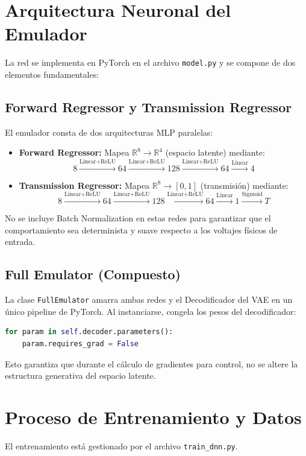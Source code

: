 \documentclass[12pt,letterpaper]{article}
\begin{document}
\section{Arquitectura Neuronal del Emulador}
La red se implementa en PyTorch en el archivo \texttt{model.py} y se compone de dos elementos fundamentales:

\subsection{Forward Regressor y Transmission Regressor}
El emulador consta de dos arquitecturas MLP paralelas:
\begin{itemize}
    \item \textbf{Forward Regressor:} Mapea $\mathbb{R}^8 \to \mathbb{R}^4$ (espacio latente) mediante:
    \begin{equation}
        8 \xrightarrow{\text{Linear+ReLU}} 64 \xrightarrow{\text{Linear+ReLU}} 128 \xrightarrow{\text{Linear+ReLU}} 64 \xrightarrow{\text{Linear}} 4
    \end{equation}
    \item \textbf{Transmission Regressor:} Mapea $\mathbb{R}^8 \to [0, 1]$ (transmisión) mediante:
    \begin{equation}
        8 \xrightarrow{\text{Linear+ReLU}} 64 \xrightarrow{\text{Linear+ReLU}} 128 \xrightarrow{\text{Linear+ReLU}} 64 \xrightarrow{\text{Linear}} 1 \xrightarrow{\text{Sigmoid}} T
    \end{equation}
\end{itemize}
No se incluye Batch Normalization en estas redes para garantizar que el comportamiento sea determinista y suave respecto a los voltajes físicos de entrada.

\subsection{Full Emulator (Compuesto)}
La clase \texttt{FullEmulator} amarra ambas redes y el Decodificador del VAE en un único pipeline de PyTorch. Al instanciarse, congela los pesos del decodificador:
\begin{lstlisting}[language=Python]
for param in self.decoder.parameters():
    param.requires_grad = False
\end{lstlisting}
Esto garantiza que durante el cálculo de gradientes para control, no se altere la estructura generativa del espacio latente.

\section{Proceso de Entrenamiento y Datos}
El entrenamiento está gestionado por el archivo \texttt{train\_dnn.py}.
\end{document}
